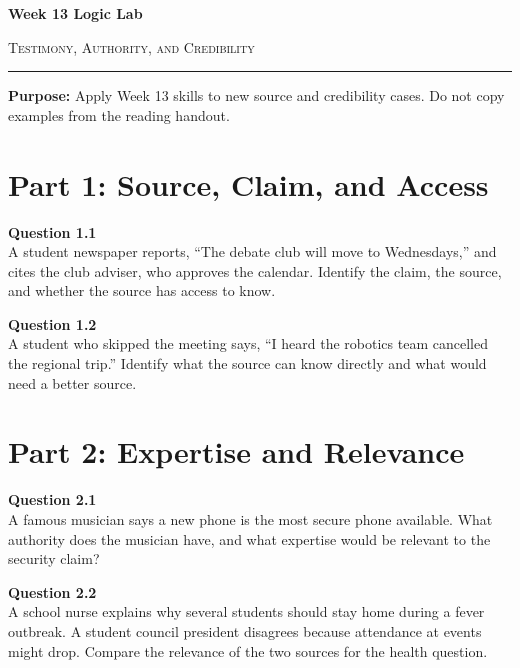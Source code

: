 \documentclass[12pt]{article}
\begin{document}
\begin{center}
{\LARGE\bfseries Week 13 Logic Lab}\par\vspace{0.05em}
{\large\scshape Testimony, Authority, and Credibility}\par\vspace{0.1em}
\rule{0.78\textwidth}{0.5pt}\par\vspace{0.15em}
\end{center}

\noindent\textbf{Purpose:} Apply Week 13 skills to new source and credibility cases. Do not copy examples from the reading handout.

\vspace{0.3em}

\section*{Part 1: Source, Claim, and Access}

\textbf{Question 1.1}\\[-0.15em]
A student newspaper reports, ``The debate club will move to Wednesdays,'' and cites the club adviser, who approves the calendar. Identify the claim, the source, and whether the source has access to know.


\textbf{Question 1.2}\\[-0.15em]
A student who skipped the meeting says, ``I heard the robotics team cancelled the regional trip.'' Identify what the source can know directly and what would need a better source.


\newpage

\section*{Part 2: Expertise and Relevance}

\textbf{Question 2.1}\\[-0.15em]
A famous musician says a new phone is the most secure phone available. What authority does the musician have, and what expertise would be relevant to the security claim?


\textbf{Question 2.2}\\[-0.15em]
A school nurse explains why several students should stay home during a fever outbreak. A student council president disagrees because attendance at events might drop. Compare the relevance of the two sources for the health question.
\end{document}
